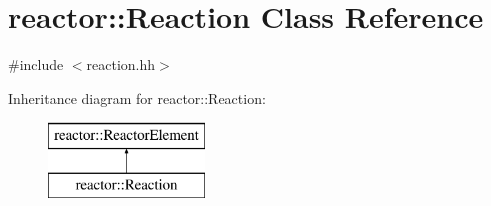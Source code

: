 \hypertarget{classreactor_1_1Reaction}{}\section{reactor\+:\+:Reaction Class Reference}
\label{classreactor_1_1Reaction}


{\ttfamily \#include $<$reaction.\+hh$>$}

Inheritance diagram for reactor\+:\+:Reaction\+:\begin{figure}[H]
\begin{center}
\leavevmode
\includegraphics[height=2.000000cm]{classreactor_1_1Reaction}
\end{center}
\end{figure}
